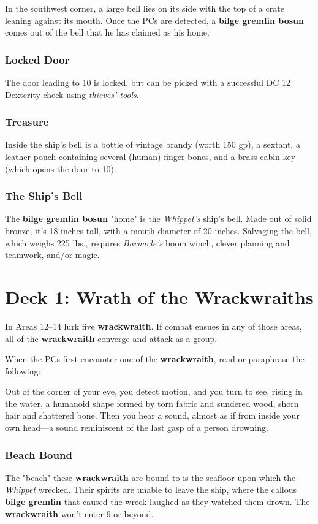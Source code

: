 \documentclass[10pt,a4paper,twoside,bg=print,twocolumn,openany,nodeprecatedcode]{dndbook}
\begin{document}
In the southwest corner, a large bell lies on its side with the top of a crate leaning against its mouth. Once the PCs are detected, a \textbf{bilge gremlin bosun} comes out of the bell that he has claimed as his home.

\subsubsection{Locked Door}
The door leading to 10 is locked, but can be picked with a successful DC 12 Dexterity check using \textit{thieves' tools}.

\subsubsection{Treasure}
Inside the ship's bell is a bottle of vintage brandy (worth 150 gp), a sextant, a leather pouch containing several (human) finger bones, and a brass cabin key (which opens the door to 10).

\subsubsection{The Ship's Bell}
The \textbf{bilge gremlin bosun} "home" is the \textit{Whippet's} ship's bell. Made out of solid bronze, it's 18 inches tall, with a mouth diameter of 20 inches. Salvaging the bell, which weighs 225 lbs., requires \textit{Barnacle's} boom winch, clever planning and teamwork, and/or magic.

\section{Deck 1: Wrath of the Wrackwraiths}
In Areas 12–14 lurk five \textbf{wrackwraith}. If combat ensues in any of those areas, all of the \textbf{wrackwraith} converge and attack as a group.

When the PCs first encounter one of the \textbf{wrackwraith}, read or paraphrase the following:

\begin{DndReadAloud}{}
Out of the corner of your eye, you detect motion, and you turn to see, rising in the water, a humanoid shape formed by torn fabric and sundered wood, shorn hair and shattered bone. Then you hear a sound, almost as if from inside your own head—a sound reminiscent of the last gasp of a person drowning.

\end{DndReadAloud}

\subsubsection{Beach Bound}
The "beach" these \textbf{wrackwraith} are bound to is the seafloor upon which the \textit{Whippet} wrecked. Their spirits are unable to leave the ship, where the callous \textbf{bilge gremlin} that caused the wreck laughed as they watched them drown. The \textbf{wrackwraith} won't enter 9 or beyond.
\end{document}
